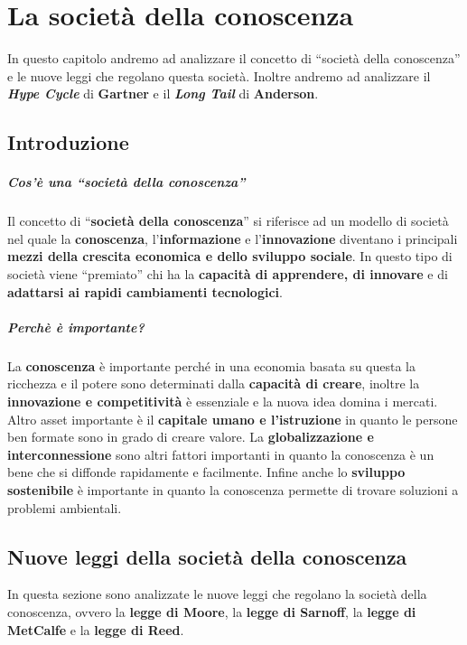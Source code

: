\chapter{La società della conoscenza}
\thispagestyle{chapterInit}
In questo capitolo andremo ad analizzare il concetto di ``società della conoscenza'' e le nuove leggi che regolano questa società. Inoltre andremo ad analizzare il \textit{\textbf{Hype Cycle}} di \textbf{Gartner} e il \textit{\textbf{Long Tail}} di \textbf{Anderson}.
\section{Introduzione}
    \paragraph{Cos'è una ``società della conoscenza''} Il concetto di ``\textbf{società della conoscenza}'' si riferisce ad un modello di società nel quale la \textbf{conoscenza}, l'\textbf{informazione} e l'\textbf{innovazione} diventano i principali \textbf{mezzi della crescita economica e dello sviluppo sociale}. In questo tipo di società viene ``premiato'' chi ha la \textbf{capacità di apprendere, di innovare} e di \textbf{adattarsi ai rapidi cambiamenti tecnologici}.
    \paragraph{Perchè è importante?} La \textbf{conoscenza} è importante perché in una economia basata su questa la ricchezza e il potere sono determinati dalla \textbf{capacità di creare}, inoltre la \textbf{innovazione e competitività} è essenziale e la nuova idea domina i mercati. Altro asset importante è il \textbf{capitale umano e l'istruzione} in quanto le persone ben formate sono in grado di creare valore. La \textbf{globalizzazione e interconnessione} sono altri fattori importanti in quanto la conoscenza è un bene che si diffonde rapidamente e facilmente. Infine anche lo \textbf{sviluppo sostenibile} è importante in quanto la conoscenza permette di trovare soluzioni a problemi ambientali.
\section{Nuove leggi della società della conoscenza}
    In questa sezione sono analizzate le nuove leggi che regolano la società della conoscenza, ovvero la \textbf{legge di Moore}, la \textbf{legge di Sarnoff}, la \textbf{legge di MetCalfe} e la \textbf{legge di Reed}.
